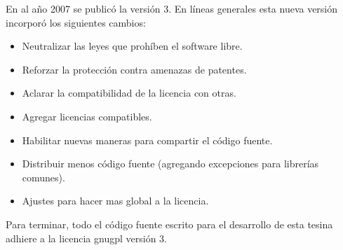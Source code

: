 En al año 2007 se publicó la versión 3. En líneas generales esta nueva versión incorporó los siguientes cambios\cite{gpl3guide2014fsf}:
\begin{itemize}
\item Neutralizar las leyes que prohíben el software libre.
\item Reforzar la protección contra amenazas de patentes.
\item Aclarar la compatibilidad de la licencia con otras.
\item Agregar licencias compatibles.
\item Habilitar nuevas maneras para compartir el código fuente.
\item Distribuir menos código fuente (agregando excepciones para librerías comunes).
\item Ajustes para hacer mas global a la licencia.
\end{itemize}

Para terminar, todo el código fuente escrito para el desarrollo de esta tesina adhiere a la licencia \gls{gnugpl} versión 3.
